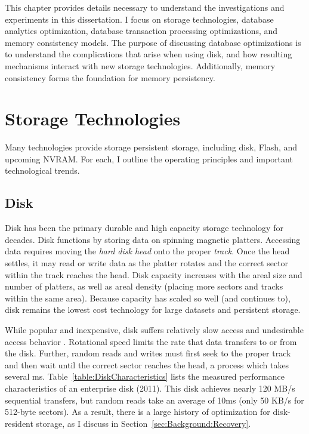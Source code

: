 This chapter provides details necessary to understand the investigations and experiments in this dissertation.
I focus on storage technologies, database analytics optimization, database transaction processing optimizations, and memory consistency models.
The purpose of discussing database optimizations is to understand the complications that arise when using disk, and how resulting mechanisms interact with new storage technologies.
Additionally, memory consistency forms the foundation for memory persistency.

\section{Storage Technologies}
\label{sec:Background:Storage}

Many technologies provide storage persistent storage, including disk, Flash, and upcoming NVRAM.
For each, I outline the operating principles and important technological trends.



\subsection{Disk}
\label{sec:Background:Storage:Disk}
Disk has been the primary durable and high capacity storage technology for decades.
Disk functions by storing data on spinning magnetic platters.
Accessing data requires moving the \emph{hard disk head} onto the proper \emph{track}.
Once the head settles, it may read or write data as the platter rotates and the correct sector within the track reaches the head.
Disk capacity increases with the areal size and number of platters, as well as areal density (placing more sectors and tracks within the same area).
Because capacity has scaled so well (and continues to), disk remains the lowest cost technology for large datasets and persistent storage.

While popular and inexpensive, disk suffers relatively slow access and undesirable access behavior \cite{RuemmlerWilkes94}.
Rotational speed limits the rate that data transfers to or from the disk.
Further, random reads and writes must first seek to the proper track and then wait until the correct sector reaches the head, a process which takes several ms.
Table~\ref{table:DiskCharacteristics} lists the measured performance characteristics of an enterprise disk (2011).
This disk achieves nearly 120 MB/s sequential transfers, but random reads take an average of 10ms (only 50 KB/s for 512-byte sectors).
As a result, there is a large history of optimization for disk-resident storage, as I discuss in Section~\ref{sec:Background:Recovery}.

